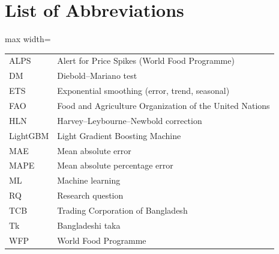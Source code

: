 \chapter*{List of Abbreviations}
\begin{adjustbox}{max width=\linewidth}\begin{tabular}{ll}
ALPS & Alert for Price Spikes (World Food Programme) \\
DM & Diebold--Mariano test \\
ETS & Exponential smoothing (error, trend, seasonal) \\
FAO & Food and Agriculture Organization of the United Nations \\
HLN & Harvey--Leybourne--Newbold correction \\
LightGBM & Light Gradient Boosting Machine \\
MAE & Mean absolute error \\
MAPE & Mean absolute percentage error \\
ML & Machine learning \\
RQ & Research question \\
TCB & Trading Corporation of Bangladesh \\
Tk & Bangladeshi taka \\
WFP & World Food Programme \\
\end{tabular}\end{adjustbox}
